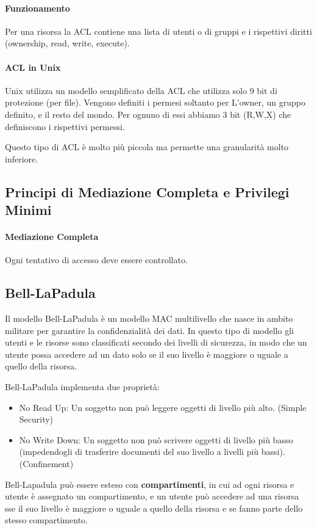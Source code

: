 \documentclass[12pt, a4paper, openany]{book}
\begin{document}
\paragraph{Funzionamento} Per una risorsa la ACL contiene una lista di utenti o di gruppi e i rispettivi diritti (ownership, read, write, execute).

\paragraph{ACL in Unix}
Unix utilizza un modello semplificato della ACL che utilizza solo 9 bit di protezione (per file).
Vengono definiti i permesi soltanto per L'owner, un gruppo definito, e il resto del mondo. Per ognuno di essi abbiamo 3 bit (R,W,X) che definiscono i rispettivi permessi.

Questo tipo di ACL è molto più piccola ma permette una granularità molto inferiore.

\subsection{Principi di Mediazione Completa e Privilegi Minimi}
\paragraph{Mediazione Completa} Ogni tentativo di accesso deve essere controllato.


\subsection{Bell-LaPadula}
Il modello Bell-LaPadula è un modello MAC multilivello che nasce in ambito militare per garantire la confidenzialità dei dati.
In questo tipo di modello gli utenti e le risorse sono classificati secondo dei livelli di sicurezza, in modo che un utente possa accedere ad un dato solo se il suo livello è maggiore o uguale a quello della risorsa.

Bell-LaPadula implementa due proprietà:
\begin{itemize}
    \item No Read Up: Un soggetto non può leggere oggetti di livello più alto. (Simple Security)
    \item No Write Down: Un soggetto non può scrivere oggetti di livello più basso (impedendogli di trasferire documenti del suo livello a livelli più bassi). (Confinement)
\end{itemize}

Bell-Lapadula può essere esteso con \textbf{compartimenti}, in cui ad ogni risorsa e utente è assegnato un compartimento, e un utente può accedere ad una risorsa sse il suo livello è maggiore o uguale a quello della risorsa e se fanno parte dello stesso compartimento.
\end{document}
